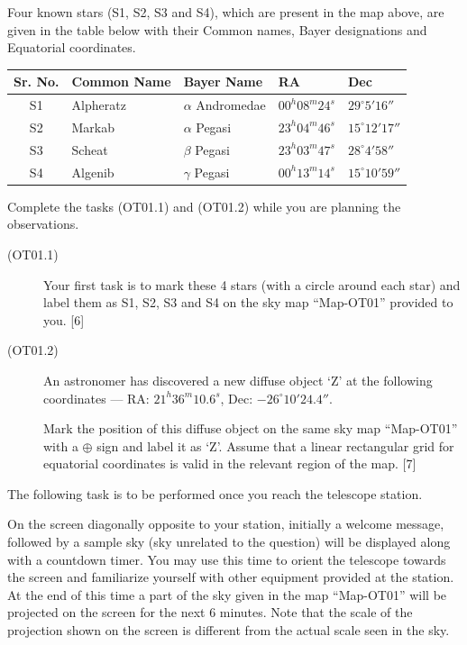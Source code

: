 
Four known stars (S1, S2, S3 and S4), which are present in the map above,
are given in the table below with their Common names, Bayer designations and
Equatorial coordinates.

\begin{center}
\begin{tabular}{cllll}
Sr. No. & Common Name & Bayer Name & RA & Dec \\
\hline
S1 & Alpheratz & $\alpha$ Andromedae & $00^h08^m24^s$ & $29^\circ 5'16''$ \\
S2 & Markab & $\alpha$ Pegasi & $23^h04^m46^s$ & $15^\circ 12'17''$ \\
S3 & Scheat & $\beta$ Pegasi & $23^h03^m47^s$ & $28^\circ 4'58''$ \\
S4 & Algenib & $\gamma$ Pegasi & $00^h13^m14^s$ & $15^\circ 10'59''$ \\
\end{tabular}
\end{center}

Complete the tasks (OT01.1) and (OT01.2) while you are planning the
observations.

\begin{description}
\item[(OT01.1)] Your first task is to mark these 4 stars (with a circle
  around each star) and label them as S1, S2, S3 and S4 on the sky map
  ``Map-OT01'' provided to you. \hfill[6]
\item[(OT01.2)] An astronomer has discovered a new diffuse object `Z' at the
  following coordinates ---
  RA: $21^h36^m10.6^s$, Dec: $-26^\circ 10'24.4''$.

  Mark the position of this diffuse object on the same sky map ``Map-OT01''
  with a $\oplus$ sign and label it as `Z'. Assume that a linear rectangular
  grid for equatorial coordinates is valid in the relevant region of the
  map. \hfill[7]
\end{description}

The following task is to be performed once you reach the telescope station.

On the screen diagonally opposite to your station, initially a welcome
message, followed by a sample sky (sky unrelated to the question) will be
displayed along with a countdown timer. You may use this time to orient the
telescope towards the screen and familiarize yourself with other equipment
provided at the station. At the end of this time a part of the sky given in
the map ``Map-OT01'' will be projected on the screen for the next 6 minutes.
Note that the scale of the projection shown on the screen is different from
the actual scale seen in the sky.

